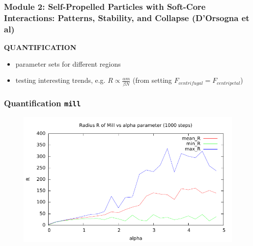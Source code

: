 \documentclass[compress]{beamer}
\begin{document}
\begin{frame}
  \frametitle{Module 2: Self-Propelled Particles with Soft-Core Interactions: Patterns, Stability, and Collapse (D'Orsogna et al)}
	
	\textbf{QUANTIFICATION}
	
\begin{itemize}
	\item parameter sets for different regions
	\item testing interesting trends, e.g. \( R \propto \frac{\alpha m}{\beta N}\) (from setting \( F_{centrifugal} = F_{centripetal} \))

	
\end{itemize}
	
\end{frame}


\begin{frame}
	\frametitle{Quantification \texttt{mill}}
\begin{figure}[H]
	\includegraphics[width=1. \columnwidth]{../plots/mill_II_radius_alpha_1000.pdf}
\end{figure}
\end{frame}
\end{document}
